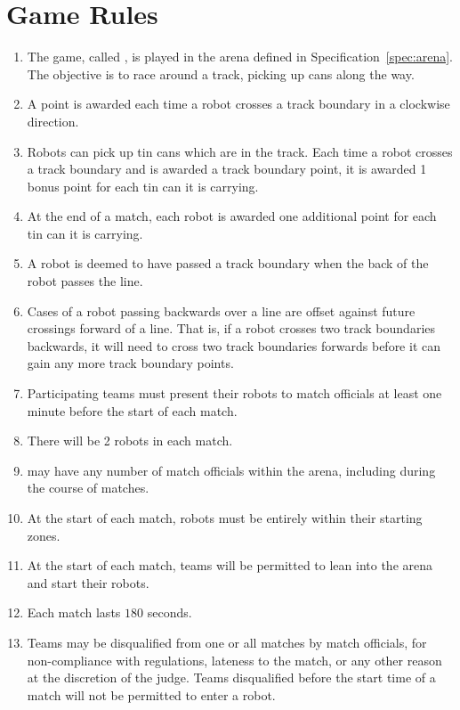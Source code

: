 \section{Game Rules}
\label{sec:rules}

\begin{enumerate}
  \item The game, called \emph{\gamename}, is played in the arena defined in
        Specification~\ref{spec:arena}. The objective is to race around a
        track, picking up cans along the way.
  \item A point is awarded each time a robot crosses a track boundary in a
        clockwise direction.
  \item Robots can pick up tin cans which are in the track. Each time a robot
        crosses a track boundary and is awarded a track boundary point, it is
        awarded 1 bonus point for each tin can it is carrying.
  \item At the end of a match, each robot is awarded one additional point for
        each tin can it is carrying.
  \item A robot is deemed to have passed a track boundary when the back of the
        robot passes the line.
  \item Cases of a robot passing backwards over a line are offset against
        future crossings forward of a line. That is, if a robot crosses two
        track boundaries backwards, it will need to cross two track boundaries
        forwards before it can gain any more track boundary points.
  \item Participating teams must present their robots to match officials at
        least one minute before the start of each match.
  \item There will be 2 robots in each match.
  \item \org may have any number of match officials within the arena, including
        during the course of matches.
  \item At the start of each match, robots must be entirely within their
        starting zones.
  \item At the start of each match, teams will be permitted to lean into the
        arena and start their robots.
  \item Each match lasts $180$ seconds.
  \item Teams may be disqualified from one or all matches by match officials,
        for non-compliance with regulations, lateness to the match, or any other
        reason at the discretion of the judge. Teams disqualified before the
        start time of a match will not be permitted to enter a robot.
\end{enumerate}

